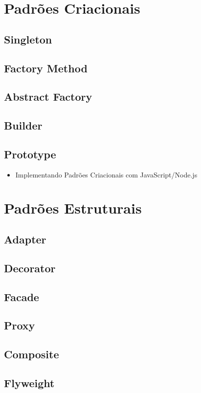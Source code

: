 \section{Padrões Criacionais}

\subsection{Singleton}
\subsection{Factory Method}
\subsection{Abstract Factory}
\subsection{Builder}
\subsection{Prototype}
\begin{itemize}
\item Implementando Padrões Criacionais com JavaScript/Node.js
\end{itemize}


\section{Padrões Estruturais}

\subsection{Adapter}
\subsection{Decorator}
\subsection{Facade}
\subsection{Proxy}
\subsection{Composite}
\subsection{Flyweight}
